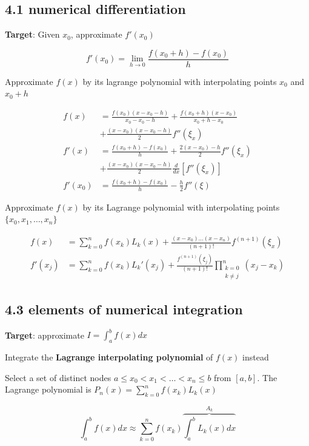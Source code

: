 \documentclass[11pt]{article}
\begin{document}
\subsection{4.1 numerical differentiation}
\label{sec:org4cbec17}
\textbf{Target}: Given \(x_0\), approximate \(f'(x_0)\)

\begin{equation*}
f'(x_0)=\lim\limits_{h\to0}\frac{f(x_0+h)-f(x_0)}{h}
\end{equation*}

Approximate \(f(x)\) by its lagrange polynomial with interpolating points \(x_0\)
and \(x_0+h\)

\begin{align*}
f(x)&=\frac{f(x_0)(x-x_0-h)}{x_0-x_0-h}+\frac{f(x_0+h)(x-x_0)}{x_0+h-x_0}\\
&+\frac{(x-x_0)(x-x_0-h)}{2}f''(\xi_x)\\
f'(x)&=\frac{f(x_0+h)-f(x_0)}{h}+\frac{2(x-x_0)-h}{2}f''(\xi_x)\\
&+\frac{(x-x_0)(x-x_0-h)}{2}\frac{d}{dx}[f''(\xi_x)]\\
f'(x_0)&=\frac{f(x_0+h)-f(x_0)}{h}-\frac{h}{2}f''(\xi)
\end{align*}

Approximate \(f(x)\) by its Lagrange polynomial with interpolating points
\(\{x_0,x_1,\dots,x_n\}\)

\begin{align*}
f(x)&=\displaystyle\sum_{k=0}^nf(x_k)L_k(x)+\frac{(x-x_0)\dots(x-x_n)}{(n+1)!}
f^{(n+1)}(\xi_x)\\
f'(x_j)&=\displaystyle\sum_{k=0}^nf(x_k)L_k'(x_j)+\frac{f^{(n+1)}(\xi_j)}{(n+1)!}
\displaystyle\prod_{\substack{k=0\\k\neq j}}^n(x_j-x_k)
\end{align*}
\subsection{4.3 elements of numerical integration}
\label{sec:org7948fab}
\textbf{Target}: approximate \(I=\int_a^bf(x)dx\)

Integrate the \textbf{Lagrange interpolating polynomial} of \(f(x)\) instead

Select a set of distinct nodes \(a\le x_0<x_1<\dots<x_n\le b\) from \([a,b]\).
The Lagrange polynomial is \(P_n(x)=\displaystyle\sum_{k=0}^nf(x_k)L_k(x)\)

\begin{equation*}
\int_a^bf(x)dx\approx \displaystyle\sum_{k=0}^nf(x_k)
\overbrace{\int_a^b L_k(x)dx}^{A_k}
\end{equation*}
\end{document}
